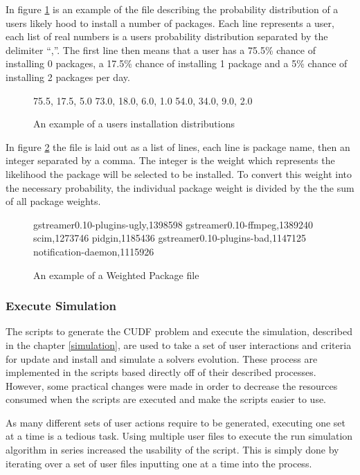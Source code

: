 In figure \ref{userprob} is an example of the file describing the probability distribution of a users likely hood to install a number of packages.
Each line represents a user, each list of real numbers is a users probability distribution separated by the delimiter ``,''.
The first line then means that a user has a 75.5\% chance of installing 0 packages, a 17.5\% chance of installing 1 package and a 5\% chance of installing 2 packages per day.

\begin{figure}[htp]
\begin{center}
75.5, 17.5, 5.0
73.0, 18.0, 6.0, 1.0
54.0, 34.0, 9.0, 2.0
\caption[Install Distribution Example File]{An example of a users installation distributions}
\label{userprob}
\end{center}
\end{figure}

In figure \ref{packageprob} the file is laid out as a list of lines, each line is package name, then an integer separated by a comma.
The integer is the weight which represents the likelihood the package will be selected to be installed.
To convert this weight into the necessary probability, the individual package weight is divided by the the sum of all package weights. 

\begin{figure}[htp]
\begin{center}
gstreamer0.10-plugins-ugly,1398598
gstreamer0.10-ffmpeg,1389240
scim,1273746
pidgin,1185436
gstreamer0.10-plugins-bad,1147125
notification-daemon,1115926
\caption[Weighted Package File Example]{An example of a Weighted Package file }
\label{packageprob}
\end{center}
\end{figure}

\subsubsection{Execute Simulation}
The scripts to generate the CUDF problem and execute the simulation, described in the chapter \ref{simulation}, 
are used to take a set of user interactions and criteria for update and install and simulate a solvers evolution.
These process are implemented in the scripts based directly off of their described processes. 
However, some practical changes were made in order to decrease the resources consumed when the scripts are executed and make the scripts easier to use.

As many different sets of user actions require to be generated, executing one set at a time is a tedious task.
Using multiple user files to execute the run simulation algorithm in series increased the usability of the script.
This is simply done by iterating over a set of user files inputting one at a time into the process. 

